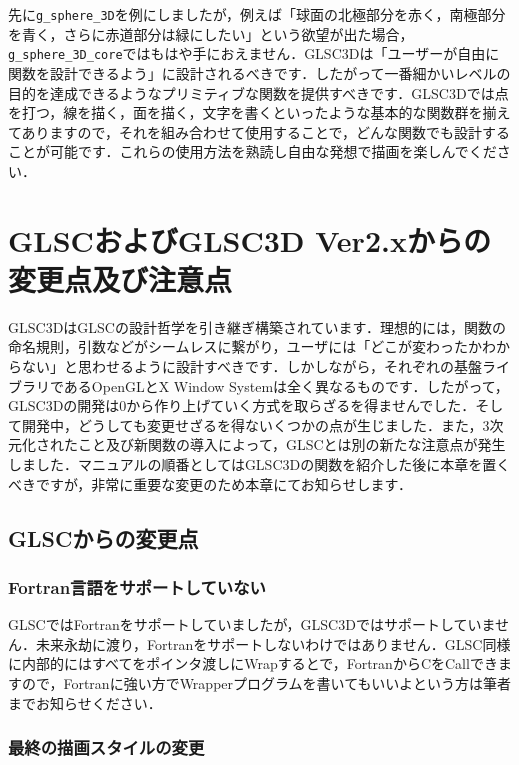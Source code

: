 \documentclass[platex,a4paper,12pt]{jsarticle}%
\begin{document}

先に\verb|g_sphere_3D|を例にしましたが，例えば「球面の北極部分を赤く，南極部分を青く，さらに赤道部分は緑にしたい」という欲望が出た場合，\verb|g_sphere_3D_core|ではもはや手におえません．GLSC3Dは「ユーザーが自由に関数を設計できるよう」に設計されるべきです．したがって一番細かいレベルの目的を達成できるようなプリミティブな関数を提供すべきです．GLSC3Dでは点を打つ，線を描く，面を描く，文字を書くといったような基本的な関数群を揃えてありますので，それを組み合わせて使用することで，どんな関数でも設計することが可能です．これらの使用方法を熟読し自由な発想で描画を楽しんでください．

\newpage
\section{GLSCおよびGLSC3D Ver2.xからの変更点及び注意点}

GLSC3DはGLSCの設計哲学を引き継ぎ構築されています．理想的には，関数の命名規則，引数などがシームレスに繋がり，ユーザには「どこが変わったかわからない」と思わせるように設計すべきです．しかしながら，それぞれの基盤ライブラリであるOpenGLとX Window Systemは全く異なるものです．したがって，GLSC3Dの開発は0から作り上げていく方式を取らざるを得ませんでした．そして開発中，どうしても変更せざるを得ないくつかの点が生じました．また，3次元化されたこと及び新関数の導入によって，GLSCとは別の新たな注意点が発生しました．マニュアルの順番としてはGLSC3Dの関数を紹介した後に本章を置くべきですが，非常に重要な変更のため本章にてお知らせします．

\subsection{GLSCからの変更点}

\subsubsection{Fortran言語をサポートしていない}

GLSCではFortranをサポートしていましたが，GLSC3Dではサポートしていません．未来永劫に渡り，Fortranをサポートしないわけではありません．GLSC同様に内部的にはすべてをポインタ渡しにWrapするとで，FortranからCをCallできますので，Fortranに強い方でWrapperプログラムを書いてもいいよという方は筆者までお知らせください．

\subsubsection{最終の描画スタイルの変更}
\end{document}

